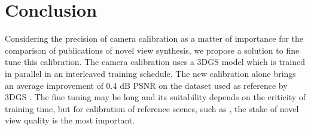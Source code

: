 \documentclass{article}
\begin{document}
\section{Conclusion}

Considering the precision of camera calibration as a matter of importance for the comparison of publications of
novel view synthesis, we propose a solution to fine tune this calibration. The camera calibration uses a 
3DGS model which is trained in parallel in an interleaved training schedule.
The new calibration alone brings an average improvement of 0.4 dB PSNR on the dataset used as reference by 3DGS \cite{kerbl20233d}.
The fine tuning may be long and its suitability depends on the criticity of training time, but for calibration
of reference scenes, such as \cite{barron2022mip}, the stake of novel view quality is the most important.




\end{document}
